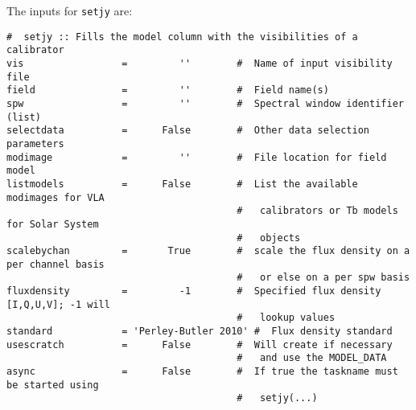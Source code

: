 The inputs for {\tt setjy} are:
\small
\begin{verbatim}
#  setjy :: Fills the model column with the visibilities of a calibrator
vis                 =         ''        #  Name of input visibility file
field               =         ''        #  Field name(s)
spw                 =         ''        #  Spectral window identifier (list)
selectdata          =      False        #  Other data selection parameters
modimage            =         ''        #  File location for field model
listmodels          =      False        #  List the available modimages for VLA
                                        #   calibrators or Tb models for Solar System
                                        #   objects
scalebychan         =       True        #  scale the flux density on a per channel basis
                                        #   or else on a per spw basis
fluxdensity         =         -1        #  Specified flux density [I,Q,U,V]; -1 will
                                        #   lookup values
standard            = 'Perley-Butler 2010' #  Flux density standard
usescratch          =      False        #  Will create if necessary
                                        #   and use the MODEL_DATA
async               =      False        #  If true the taskname must be started using
                                        #   setjy(...)
\end{verbatim}
\normalsize 


